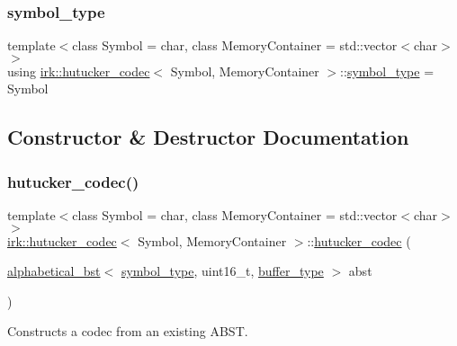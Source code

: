 \subsubsection{\texorpdfstring{symbol\+\_\+type}{symbol\_type}}
{\footnotesize\ttfamily template$<$class Symbol  = char, class Memory\+Container  = std\+::vector$<$char$>$$>$ \\
using \mbox{\hyperlink{classirk_1_1hutucker__codec}{irk\+::hutucker\+\_\+codec}}$<$ Symbol, Memory\+Container $>$\+::\mbox{\hyperlink{classirk_1_1hutucker__codec_af23dee5959ae2a69eea0ab324cf6ecb6}{symbol\+\_\+type}} =  Symbol}



\subsection{Constructor \& Destructor Documentation}
\mbox{\label{classirk_1_1hutucker__codec_a07f7f1c0f6fa0162dcafe5848fdfbb73}} 
\subsubsection{\texorpdfstring{hutucker\+\_\+codec()}{hutucker\_codec()}\hspace{0.1cm}{\footnotesize\ttfamily [1/2]}}
{\footnotesize\ttfamily template$<$class Symbol  = char, class Memory\+Container  = std\+::vector$<$char$>$$>$ \\
\mbox{\hyperlink{classirk_1_1hutucker__codec}{irk\+::hutucker\+\_\+codec}}$<$ Symbol, Memory\+Container $>$\+::\mbox{\hyperlink{classirk_1_1hutucker__codec}{hutucker\+\_\+codec}} (\begin{DoxyParamCaption}\item[{\mbox{\hyperlink{classirk_1_1alphabetical__bst}{alphabetical\+\_\+bst}}$<$ \mbox{\hyperlink{classirk_1_1hutucker__codec_af23dee5959ae2a69eea0ab324cf6ecb6}{symbol\+\_\+type}}, uint16\+\_\+t, \mbox{\hyperlink{classirk_1_1hutucker__codec_a995378c8c253dae9867a4b1762eeaf95}{buffer\+\_\+type}} $>$}]{abst }\end{DoxyParamCaption})\hspace{0.3cm}{\ttfamily [inline]}}



Constructs a codec from an existing A\+B\+ST. 


